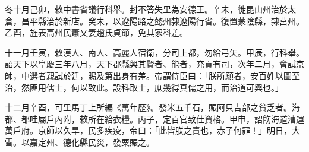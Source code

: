 \begin{pinyinscope}
 冬十月己卯，敕中書省議行科舉。封不答失里為安德王。辛未，徙昆山州治於太倉，昌平縣治於新店。癸未，以遼陽路之懿州隸遼陽行省。復置蒙陰縣，隸莒州。乙酉，旌表高州民蕭乂妻趙氏貞節，免其家科差。



 十一月壬寅，敕漢人、南人、高麗人宿衛，分司上都，勿給弓矢。甲辰，行科舉。詔天下以皇慶三年八月，天下郡縣興其賢者、能者，充貢有司，次年二月，會試京師，中選者親試於廷，賜及第出身有差。帝謂侍臣曰：「朕所願者，安百姓以圖至治，然匪用儒士，何以致此。設科取士，庶幾得真儒之用，而治道可興也。」



 十二月辛酉，可里馬丁上所編《萬年歷》。發米五千石，賑阿只吉部之貧乏者。海都、都哇屬戶內附，敕所在給衣糧。丙子，定百官致仕資格。甲申，詔飭海道漕運萬戶府。京師以久旱，民多疾疫，帝曰：「此皆朕之責也，赤子何罪！」明日，大雪。以嘉定州、德化縣民災，發粟賑之。



\end{pinyinscope}